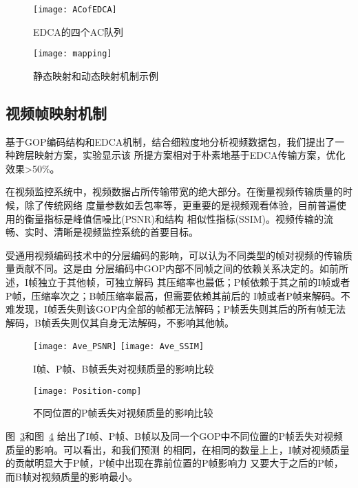 \begin{figure}[H] %
  \centering
  \texttt{[image: ACofEDCA]}
  \caption{EDCA的四个AC队列}
  \label{fig:acofedca}
\end{figure}
\begin{figure}[H] %
  \centering
  \texttt{[image: mapping]}
  \caption{静态映射和动态映射机制示例}
  \label{fig:originmapping}
\end{figure}

\subsection{视频帧映射机制}
基于GOP编码结构和EDCA机制，结合细粒度地分析视频数据包，我们提出了一种跨层映射方案，实验显示该
所提方案相对于朴素地基于EDCA传输方案，优化效果>50\%。

在视频监控系统中，视频数据占所传输带宽的绝大部分。在衡量视频传输质量的时候，除了传统网络
度量参数如丢包率等，更重要的是视频观看体验，目前普遍使用的衡量指标是峰值信噪比(PSNR)和结构
相似性指标(SSIM)。视频传输的流畅、实时、清晰是视频监控系统的首要目标。

受通用视频编码技术中的分层编码的影响，可以认为不同类型的帧对视频的传输质量贡献不同。这是由
分层编码中GOP内部不同帧之间的依赖关系决定的。如前所述，I帧独立于其他帧，可独立解码
其压缩率也最低；P帧依赖于其之前的I帧或者P帧，压缩率次之；B帧压缩率最高，但需要依赖其前后的
I帧或者P帧来解码。不难发现，I帧丢失则该GOP内全部的帧都无法解码；P帧丢失则其后的所有帧无法
解码，B帧丢失则仅其自身无法解码，不影响其他帧。

\begin{figure}[h]
  \centering
  \subcaptionbox{}
      {\texttt{[image: Ave\_PSNR]}}
  \hspace{1em}
  \subcaptionbox{}
    {\texttt{[image: Ave\_SSIM]}}
  \caption{I帧、P帧、B帧丢失对视频质量的影响比较}
  \label{fig:ipb-comp}
\end{figure}

\begin{figure}[H] %
  \centering
  \texttt{[image: Position-comp]}
  \caption{不同位置的P帧丢失对视频质量的影响比较}
  \label{fig:position-comp}
\end{figure}

图~\ref{fig:ipb-comp}和图~\ref{fig:position-comp}
给出了I帧、P帧、B帧以及同一个GOP中不同位置的P帧丢失对视频质量的影响。可以看出，和我们预测
的相同，在相同的数量上上，I帧对视频质量的贡献明显大于P帧，P帧中出现在靠前位置的P帧影响力
又要大于之后的P帧，而B帧对视频质量的影响最小。

